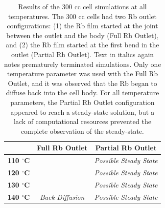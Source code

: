 \begin{table}[b]
\caption{Results of the 300 cc cell simulations at all temperatures. The 300 cc cells had two Rb outlet configurations: (1) the Rb film started at the joint between the outlet and the body (Full Rb Outlet), and (2) the Rb film started at the first bend in the outlet (Partial Rb Outlet). Text in italics again notes prematurely terminated simulations. Only one temperature parameter was used with the Full Rb Outlet, and it was observed that the Rb began to diffuse back into the cell body. For all temperature parameters, the Partial Rb Outlet configuration appeared to reach a steady-state solution, but a lack of computational resources prevented the complete observation of the steady-state.\label{tab:all300ccresults}}
    \begin{tabular}{c|c|c|}
                                    & \textbf{Full Rb Outlet}   & \textbf{Partial Rb Outlet} \\ \hline
    \textbf{110 $^{\circ}$C}        & \cellcolor{black!25}      & \textit{Possible Steady State}\\ \hline
    \textbf{120 $^{\circ}$C}        & \cellcolor{black!25}      & \textit{Possible Steady State}\\ \hline
    \textbf{130 $^{\circ}$C}        & \cellcolor{black!25}      & \textit{Possible Steady State}\\ \hline
    \textbf{140 $^{\circ}$C}        & \textit{Back-Diffusion}   & \textit{Possible Steady State}\\ \hline
    \end{tabular}
    \label{tab:my_label}
\end{table}